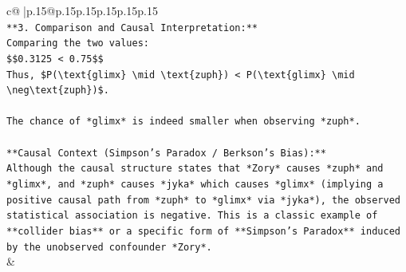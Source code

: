 \documentclass{article}
\begin{document}
{\begin{supertabular}{c@{$\;$}|p{.15\linewidth}@{}p{.15\linewidth}p{.15\linewidth}p{.15\linewidth}p{.15\linewidth}p{.15\linewidth}}
{{{\\ 
\texttt{**3. Comparison and Causal Interpretation:**} \\
\texttt{Comparing the two values:} \\
\texttt{\$\$0.3125 < 0.75\$\$} \\
\texttt{Thus, \$P(\textbackslash{}text\{glimx\} \textbackslash{}mid \textbackslash{}text\{zuph\}) < P(\textbackslash{}text\{glimx\} \textbackslash{}mid \textbackslash{}neg\textbackslash{}text\{zuph\})\$.} \\
\\ 
\texttt{The chance of *glimx* is indeed smaller when observing *zuph*.} \\
\\ 
\texttt{**Causal Context (Simpson's Paradox / Berkson's Bias):**} \\
\texttt{Although the causal structure states that *Zory* causes *zuph* and *glimx*, and *zuph* causes *jyka* which causes *glimx* (implying a positive causal path from *zuph* to *glimx* via *jyka*), the observed statistical association is negative. This is a classic example of **collider bias** or a specific form of **Simpson's Paradox** induced by the unobserved confounder *Zory*.} \\
            }
        }
    }
    & \\ \\


\end{supertabular}}
\end{document}
